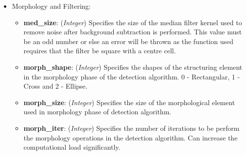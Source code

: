 \begin{itemize}
\item Morphology and Filtering:
    \begin{itemize}
        \item\textbf{med\_size}: (\emph{Integer}) Specifies the size of the median filter kernel used to remove noise after background subtraction is performed. This value must be an odd number or else an error will be thrown as the function used requires that the filter be square with a centre cell.   
        \item\textbf{morph\_shape}: (\emph{Integer}) Specifies the shapes of the structuring element in the morphology phase of the detection algorithm. 0 - Rectangular, 1 - Cross and 2 - Ellipse. 
        \item\textbf{morph\_size}: (\emph{Integer}) Specifies the size of the morphological element used in morphology phase of detection algorithm.
        \item\textbf{morph\_iter}: (\emph{Integer}) Specifies the number of iterations to be perform the morphology operations in the detection algorithm. Can increase the computational load significantly. 
    \end{itemize}


\end{itemize}
